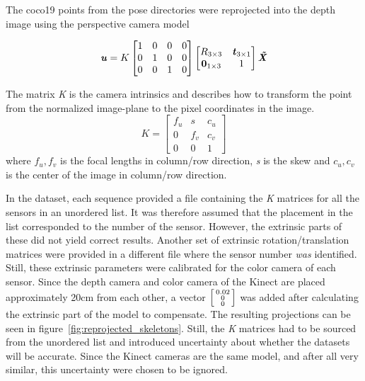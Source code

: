 The coco19 points from the pose directories were reprojected into the depth image using the perspective camera model

\begin{equation}
  \textbf{\emph{u}} = K\begin{bmatrix}1 & 0 & 0 & 0 \\ 0 & 1 & 0 & 0 \\ 0 & 0 & 1 & 0\end{bmatrix}
  \begin{bmatrix}R_{3 \times 3} & \textbf{\emph{t}}_{3 \times 1} \\ \textbf{0}_{1 \times 3} & 1\end{bmatrix}\textbf{\emph{\~{X}}}
\end{equation}

The matrix \emph{K} is the camera intrinsics and describes how to transform the point from the normalized image-plane to the pixel coordinates in the image.
\begin{equation}
  K = \begin{bmatrix}f_{u} & s & c_{u} \\ 0 & f_{v} & c_{v} \\ 0 & 0 & 1\end{bmatrix}
\end{equation}
where $f_{u}, f_{v}$ is the focal lengths in column/row direction, \emph{s} is the skew and $c_{u}, c_{v}$ is the center of the image in column/row direction.

In the dataset, each sequence provided a file containing the \emph{K} matrices for all the sensors in an unordered list. It was therefore assumed that the placement in the list corresponded to the number of the sensor. However, the extrinsic parts of these did not yield correct results. Another set of extrinsic rotation/translation matrices were provided in a different file where the sensor number \emph{was} identified. Still, these extrinsic parameters were calibrated for the color camera of each sensor. Since the depth camera and color camera of the Kinect are placed approximately 20cm from each other, a vector $\Bigl[\begin{smallmatrix}0.02\\0\\0\end{smallmatrix}\Bigr]$ was added after calculating the extrinsic part of the model to compensate. The resulting projections can be seen in figure~\ref{fig:reprojected_skeletons}. Still, the \emph{K} matrices had to be sourced from the unordered list and introduced uncertainty about whether the datasets will be accurate. Since the Kinect cameras are the same model, and after all very similar, this uncertainty were chosen to be ignored.


